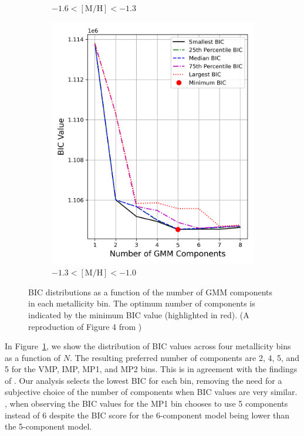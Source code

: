 \documentclass[a4paper,12pt]{article}
\begin{document}
\begin{figure}[h]
\begin{subfigure}[t]{0.23\textwidth}
        \caption{$-1.6 < \mathrm{[M/H]} < -1.3$}
    \end{subfigure}
    \hfill
    \begin{subfigure}[t]{0.23\textwidth}
        \centering
        \includegraphics[width=\linewidth]{../figures/bic_mp2.png}
        \caption{$-1.3 < \mathrm{[M/H]} < -1.0$}
    \end{subfigure}

    \caption{BIC distributions as a function of the number of GMM components in each metallicity bin. 
    The optimum number of components is indicated by the minimum BIC value (highlighted in red).
    (A reproduction of Figure 4 from \citet{zhang2024existencemetalpoordiscmilky})}
    \label{fig:bic_vs_n_components}
\end{figure}




In Figure~\ref{fig:bic_vs_n_components}, we show the distribution of BIC values across four metallicity bins as
a function of $N$. The resulting preferred number of components are 2, 4, 5, and 5 for the VMP, IMP, MP1, and MP2 bins.
This is in agreement with the findings of \citet{zhang2024existencemetalpoordiscmilky}.
Our analysis selects the lowest BIC for each bin, removing the need for a subjective choice of the number of components
when BIC values are very similar. \citet{zhang2024existencemetalpoordiscmilky}, when observing the BIC values for the MP1 bin 
chooses to use 5 components instead of 6 despite the BIC score for the 6-component model being lower than the 5-component model.
\end{document}
